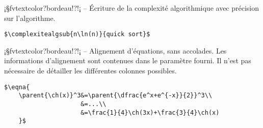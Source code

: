 \documentclass[11pt,a4paper,rgb]{report}
\begin{document}
\setlength{\leftskip}{0pt}
\setlength{\textwidth}{18cm}%


\vspace*{.75cm}

\inCodeStub¡§fvtextcolor?bordeau!?!¡ -- Écriture de la complexité algorithmique avec précision sur l'algorithme.

\setlength{\leftskip}{.75cm}%
\setlength{\textwidth}{17.25cm}%

\colorbox{blue!15}{}
\hfill
\begin{minipage}{.65\textwidth}
	\begin{lstlisting}[linewidth=\textwidth, language={[LaTeX]TeX}]
	$\complexitealgsub{n\ln(n)}{quick sort}$
	\end{lstlisting}
\end{minipage}

\setlength{\leftskip}{0pt}
\setlength{\textwidth}{18cm}%


\vspace*{.75cm}

\inCodeStub¡§fvtextcolor?bordeau!?!¡ -- Alignement d'équations, sans accolades. Les informations d'alignement sont contenues dans le paramètre fourni. Il n'est pas nécessaire de détailler les différentes colonnes possibles.

\setlength{\leftskip}{.75cm}%
\setlength{\textwidth}{17.25cm}%

\colorbox{blue!15}{}
\hfill
\begin{minipage}{.65\textwidth}
	\begin{lstlisting}[linewidth=\textwidth, language={[LaTeX]TeX}]
	$\eqna{
	\parent{\ch(x)}^3&=\parent{\dfrac{e^x+e^{-x}}{2}}^3\\
	                 &=...\\
	                 &=\frac{1}{4}\ch(3x)+\frac{3}{4}\ch(x)
	}$
	\end{lstlisting}
\end{minipage}

\setlength{\leftskip}{0pt}
\setlength{\textwidth}{18cm}%


\vspace*{.75cm}
\end{document}
